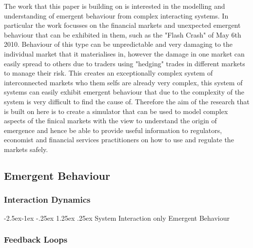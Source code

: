 \documentclass{article}
\makeatletter
\renewcommand\paragraph{\@startsection{paragraph}{4}{\z@}%
	{-2.5ex\@plus -1ex \@minus -.25ex}%
	{1.25ex \@plus .25ex}%
	{\normalfont\normalsize\bfseries}}
\makeatother
\begin{document}
The work that this paper is building on is interested in the modelling and understanding of emergent behaviour from complex interacting systems. In particular the work focusses on the financial markets and unexpected emergent behaviour that can be exhibited in them, such as the "Flash Crash" of May 6th 2010. Behaviour of this type can be unpredictable and very damaging to the individual market that it materialises in, however the damage in one market can easily spread to others due to traders using "hedging" trades in different markets to manage their risk. This creates an exceptionally complex system of interconnected markets who them selfs are already very complex, this system of systems can easily exhibit emergent behaviour that due to the complexity of the system is very difficult to find the cause of. Therefore the aim of the research that is built on here is to create a simulator that can be used to model complex aspects of the finical markets with the view to understand the origin of emergence and hence be able to provide useful information to regulators, economist and financial services practitioners on how to use and regulate the markets safely.         


\subsection{Emergent Behaviour} 

\subsubsection{Interaction Dynamics}

\paragraph{System Interaction only Emergent Behaviour} 

\subsubsection{Feedback Loops}
\end{document}
